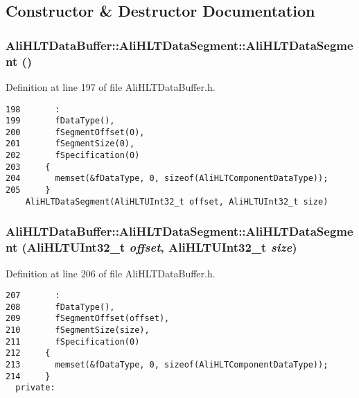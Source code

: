 \subsection{Constructor \& Destructor Documentation}
\subsubsection{\setlength{\rightskip}{0pt plus 5cm}Ali\-HLTData\-Buffer::Ali\-HLTData\-Segment::Ali\-HLTData\-Segment ()\hspace{0.3cm}{\tt  [inline]}}\label{classAliHLTDataBuffer_1_1AliHLTDataSegment_a0}




Definition at line 197 of file Ali\-HLTData\-Buffer.h.

\footnotesize\begin{verbatim}198       :
199       fDataType(),
200       fSegmentOffset(0),
201       fSegmentSize(0),
202       fSpecification(0)
203     {
204       memset(&fDataType, 0, sizeof(AliHLTComponentDataType));
205     }
    AliHLTDataSegment(AliHLTUInt32_t offset, AliHLTUInt32_t size) 
\end{verbatim}\normalsize 


\subsubsection{\setlength{\rightskip}{0pt plus 5cm}Ali\-HLTData\-Buffer::Ali\-HLTData\-Segment::Ali\-HLTData\-Segment ({\bf Ali\-HLTUInt32\_\-t} {\em offset}, {\bf Ali\-HLTUInt32\_\-t} {\em size})\hspace{0.3cm}{\tt  [inline]}}\label{classAliHLTDataBuffer_1_1AliHLTDataSegment_a1}




Definition at line 206 of file Ali\-HLTData\-Buffer.h.

\footnotesize\begin{verbatim}207       :
208       fDataType(),
209       fSegmentOffset(offset),
210       fSegmentSize(size),
211       fSpecification(0)
212     {
213       memset(&fDataType, 0, sizeof(AliHLTComponentDataType));
214     }
  private:
\end{verbatim}\normalsize 




